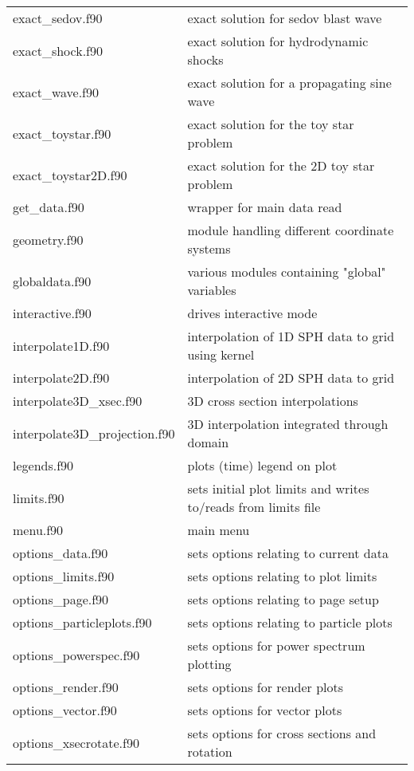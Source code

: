 \documentclass[a4paper,11pt]{article}
\begin{document}
\begin{longtable}{|lp{}|}
     exact\_sedov.f90        & exact solution for sedov blast wave\\
     exact\_shock.f90        & exact solution for hydrodynamic shocks\\
     exact\_wave.f90         & exact solution for a propagating sine wave\\
     exact\_toystar.f90      & exact solution for the toy star problem\\
     exact\_toystar2D.f90    & exact solution for the 2D toy star problem\\
     get\_data.f90           & wrapper for main data read\\
     geometry.f90           & module handling different coordinate systems\\
     globaldata.f90         & various modules containing "global" variables\\
     interactive.f90        & drives interactive mode\\
     interpolate1D.f90	 & interpolation of 1D SPH data to grid using kernel\\
     interpolate2D.f90	 & interpolation of 2D SPH data to grid     \\
     interpolate3D\_xsec.f90 & 3D cross section interpolations\\
     interpolate3D\_projection.f90	 & 3D interpolation integrated through domain\\
     legends.f90		       & plots (time) legend on plot\\
     limits.f90                   & sets initial plot limits and writes to/reads from limits file\\
     menu.f90               & main menu\\
     options\_data.f90       & sets options relating to current data\\
     options\_limits.f90     & sets options relating to plot limits\\
     options\_page.f90       & sets options relating to page setup\\
     options\_particleplots.f90 & sets options relating to particle plots\\
     options\_powerspec.f90  & sets options for power spectrum plotting\\
     options\_render.f90	 & sets options for render plots\\
     options\_vector.f90	 & sets options for vector plots\\
     options\_xsecrotate.f90 & sets options for cross sections and rotation\\

\end{longtable}
\end{document}
